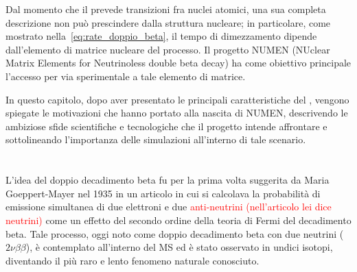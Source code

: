 %
Dal momento che il \doppiobeta{} prevede transizioni fra nuclei atomici, una sua completa descrizione non può prescindere dalla struttura nucleare; in particolare, come mostrato nella~\ref{eq:rate_doppio_beta}, il tempo di dimezzamento dipende dall'elemento di matrice nucleare del processo.
Il progetto NUMEN\cite{cappuzzello:epja18} (NUclear Matrix Elements for Neutrinoless double beta decay) ha come obiettivo principale l'accesso per via sperimentale a tale elemento di matrice.
\vspace{1cm}
 
In questo capitolo, dopo aver presentato le principali caratteristiche del \doppiobeta{}, vengono spiegate le motivazioni che hanno portato alla nascita di NUMEN, descrivendo le ambiziose sfide scientifiche e tecnologiche che il progetto intende affrontare e sottolineando l'importanza delle simulazioni all'interno di tale scenario.




\section{} \label{sez:doppio_beta_senza_neutrini}

L'idea del doppio decadimento beta fu per la prima volta suggerita da Maria Goeppert-Mayer nel 1935 in un articolo in cui si calcolava la probabilità di emissione simultanea di due elettroni e due \textcolor{red}{anti-neutrini (nell'articolo lei dice neutrini)} come un effetto del secondo ordine della teoria di Fermi del decadimento beta\cite{goeppert-mayer:pr35}. 
Tale processo, oggi noto come doppio decadimento beta con due neutrini ($ 2\nu\beta\beta $), è contemplato all'interno del MS ed è stato osservato in undici isotopi, diventando il più raro e lento fenomeno naturale conosciuto.
 
